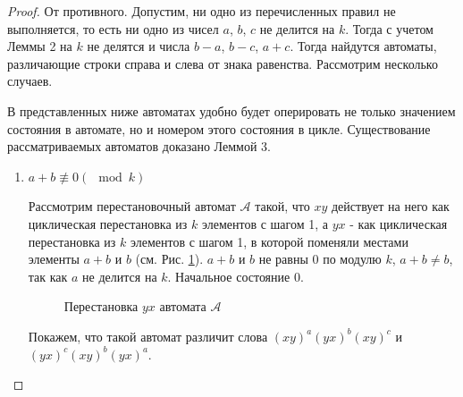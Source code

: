 \documentclass{article}
\begin{document}
	\begin{proof}
		От противного. Допустим, ни одно из перечисленных правил не выполняется, то есть ни одно из чисел $a$, $b$, $c$ не делится на $k$. Тогда с учетом Леммы 2 на $k$ не делятся и числа $b-a$, $b-c$, $a+c$. Тогда найдутся автоматы, различающие строки справа и слева от знака равенства. Рассмотрим несколько случаев.
		
		В представленных ниже автоматах удобно будет оперировать не только значением состояния в автомате, но и номером этого состояния в цикле.
		Существование рассматриваемых автоматов доказано Леммой 3.
		
		\begin{enumerate}
			\item $a+b \not \equiv 0 (\mod k)$
			
			Рассмотрим перестановочный автомат $\mathscr{A}$ такой, что $xy$ действует на него как циклическая перестановка из $k$ элементов с шагом 1, а $yx$ - как циклическая перестановка из $k$ элементов с шагом 1, в которой поменяли местами элементы $a+b$ и $b$ (см. Рис. \ref{cycle_a+b_b}). $a+b$ и $b$ не равны 0 по модулю $k$, $a+b \ne b$, так как $a$ не делится на $k$. Начальное состояние 0.
			
			\begin{figure}
				\caption{Перестановка $yx$ автомата $\mathscr{A}$}
				\label{cycle_a+b_b}
			\end{figure}
		
			Покажем, что такой автомат различит слова $(xy)^a(yx)^b(xy)^c$ и\\ $(yx)^c(xy)^b(yx)^a$.
			

\end{enumerate}
\end{proof}
\end{document}
